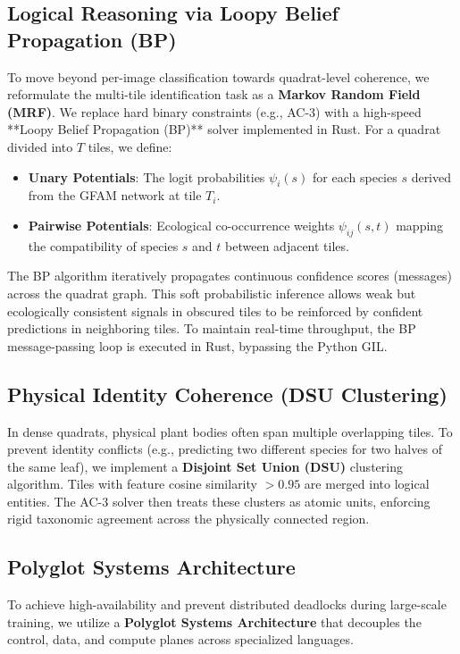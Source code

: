 \documentclass[10pt,twocolumn,letterpaper]{article}
\begin{document}
\subsection{Logical Reasoning via Loopy Belief Propagation (BP)}
To move beyond per-image classification towards quadrat-level coherence, we reformulate the multi-tile identification task as a \textbf{Markov Random Field (MRF)}. We replace hard binary constraints (e.g., AC-3) with a high-speed **Loopy Belief Propagation (BP)** solver implemented in Rust. For a quadrat divided into $T$ tiles, we define:
\begin{itemize}
    \item \textbf{Unary Potentials}: The logit probabilities $\psi_i(s)$ for each species $s$ derived from the GFAM network at tile $T_i$.
    \item \textbf{Pairwise Potentials}: Ecological co-occurrence weights $\psi_{ij}(s, t)$ mapping the compatibility of species $s$ and $t$ between adjacent tiles.
\end{itemize}
The BP algorithm iteratively propagates continuous confidence scores (messages) across the quadrat graph. This soft probabilistic inference allows weak but ecologically consistent signals in obscured tiles to be reinforced by confident predictions in neighboring tiles. To maintain real-time throughput, the BP message-passing loop is executed in Rust, bypassing the Python GIL.

\subsection{Physical Identity Coherence (DSU Clustering)}
In dense quadrats, physical plant bodies often span multiple overlapping tiles. To prevent identity conflicts (e.g., predicting two different species for two halves of the same leaf), we implement a \textbf{Disjoint Set Union (DSU)} clustering algorithm. Tiles with feature cosine similarity $> 0.95$ are merged into logical entities. The AC-3 solver then treats these clusters as atomic units, enforcing rigid taxonomic agreement across the physically connected region.

\subsection{Polyglot Systems Architecture}
To achieve high-availability and prevent distributed deadlocks during large-scale training, we utilize a \textbf{Polyglot Systems Architecture} that decouples the control, data, and compute planes across specialized languages.
\end{document}
